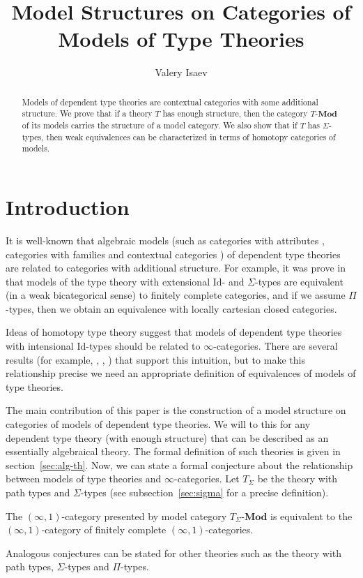 \documentclass{mscs}
\title{Model Structures on Categories of Models of Type Theories}
\author{Valery Isaev}
\newcommand{\Id}{\mathrm{Id}}
\newcommand{\cat}[1]{\mathbf{#1}}
\newcommand{\Mod}[1]{#1\text{-}\cat{Mod}}
\numberwithin{figure}{section}
\begin{document}
\maketitle

\begin{abstract}
Models of dependent type theories are contextual categories with some additional structure.
We prove that if a theory $T$ has enough structure, then the category $\Mod{T}$ of its models carries the structure of a model category.
We also show that if $T$ has $\Sigma$-types, then weak equivalences can be characterized in terms of homotopy categories of models.
\end{abstract}

\section{Introduction}

It is well-known that algebraic models (such as categories with attributes \cite{pitts}, categories with families \cite{cwf} and contextual categories \cite{GAT})
of dependent type theories are related to categories with additional structure.
For example, it was prove in \cite{ext-eq} that models of the type theory with extensional $\Id$- and $\Sigma$-types are equivalent (in a weak bicategorical sense)
to finitely complete categories, and if we assume $\Pi$-types, then we obtain an equivalence with locally cartesian closed categories.

Ideas of homotopy type theory suggest that models of dependent type theories with intensional $\Id$-types should be related to $\infty$-categories.
There are several results (for example, \cite{shul-inv}, \cite{local-universes}, \cite{kapulkin}) that support this intuition,
but to make this relationship precise we need an appropriate definition of equivalences of models of type theories.

The main contribution of this paper is the construction of a model structure on categories of models of dependent type theories.
We will to this for any dependent type theory (with enough structure) that can be described as an essentially algebraical theory.
The formal definition of such theories is given in section~\ref{sec:alg-th}.
Now, we can state a formal conjecture about the relationship between models of type theories and $\infty$-categories.
Let $T_\Sigma$ be the theory with path types and $\Sigma$-types (see subsection~\ref{sec:sigma} for a precise definition).
\begin{conj}[main]
The $(\infty,1)$-category presented by model category $\Mod{T_\Sigma}$ is equivalent to the $(\infty,1)$-category of finitely complete $(\infty,1)$-categories.
\end{conj}
Analogous conjectures can be stated for other theories such as the theory with path types, $\Sigma$-types and $\Pi$-types.
\end{document}

